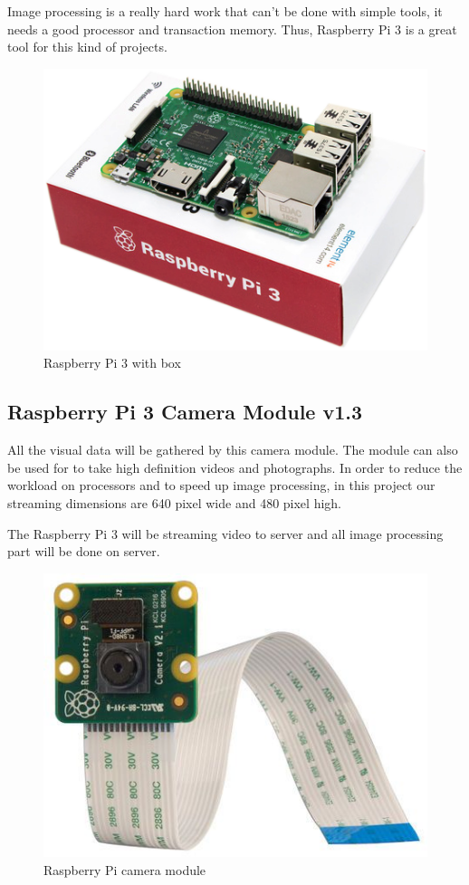 \documentclass[12pt,a4paper]{article}
\begin{document}
Image processing is a really hard work that can’t be done with simple tools, it needs a good processor and transaction memory. 
Thus, Raspberry Pi 3 is a great tool for this kind of projects.
\begin{figure}[h!]
  \begin{center}
    \includegraphics[scale=0.5]{pi_box}
    \caption{Raspberry Pi 3 with box}
  \end{center}
\end{figure}

\subsection{Raspberry Pi 3 Camera Module v1.3}
All the visual data will be gathered by this camera module. The module can also be used for to take high definition videos and photographs. 
In order to reduce the workload on processors and to speed up image processing, in this project our streaming dimensions are 640 pixel wide 
and 480 pixel high.

The Raspberry Pi 3 will be streaming video to server and all image processing part will be done on server.
\begin{figure}[h!]
  \begin{center}
    \includegraphics[scale=0.3]{pi_camera}
    \caption{Raspberry Pi camera module}
  \end{center}
\end{figure}
\end{document}
